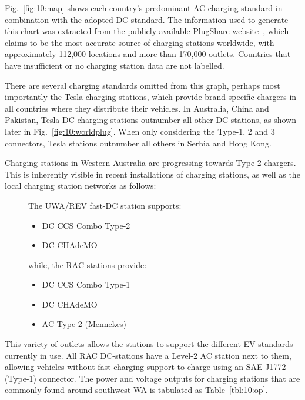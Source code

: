 Fig.~\ref{fig:10:map} shows each country's predominant AC charging standard in combination with the adopted DC standard. The information used to generate this chart was extracted from the publicly available PlugShare website~\cite{plugshare_plugshare_nodate}, which claims to be the most accurate source of charging stations worldwide, with approximately 112,000 locations and more than 170,000 outlets. Countries that have insufficient or no charging station data are not labelled. 

There are several charging standards omitted from this graph, perhaps most importantly the Tesla charging stations, which provide brand-specific chargers in all countries where they distribute their vehicles. In Australia, China and Pakistan, Tesla DC charging stations outnumber all other DC stations, as shown later in Fig.~\ref{fig:10:worldplug}. When only considering the Type-1, 2 and 3 connectors, Tesla stations outnumber all others in Serbia and Hong Kong.

Charging stations in Western Australia are progressing towards Type-2 chargers. This is inherently visible in recent installations of charging stations, as well as the local charging station networks as follows:

\begin{description}
	\item[] The UWA/REV fast-DC station supports:
	\begin{itemize}
		\item DC CCS Combo Type-2
		\item DC CHAdeMO
	\end{itemize}
	\item[]	while, the RAC stations provide:
	\begin{itemize}
		\item DC CCS Combo Type-1
		\item DC CHAdeMO
		\item AC Type-2 (Mennekes)~\cite{noauthor_ieee_2016}
	\end{itemize}
\end{description}

This variety of outlets allows the stations to support the different EV standards currently in use. All RAC DC-stations have a Level-2 AC station next to them, allowing vehicles without fast-charging support to charge using an SAE J1772 (Type-1) connector. The power and voltage outputs for charging stations that are commonly found around southwest WA is tabulated as Table~\ref{tbl:10:op}.

